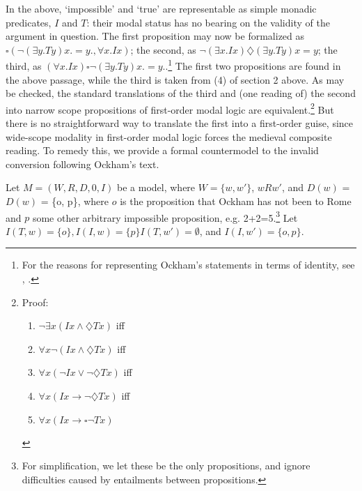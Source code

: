\documentclass[a4paper]{article}
\begin{document}
In the above, `impossible' and `true' are representable as simple monadic predicates, $I$ and $T$: their modal status has no bearing on the validity of the argument in question. The first proposition may now be formalized as $\square(\neg (\exists y.Ty)x. = y., \forall x.Ix)$; the second, as $\neg (\exists x.Ix)\diamondsuit (\exists y.Ty)x=y$; the third, as $(\forall x.Ix)\square \neg (\exists y.Ty)x.=y.$.\footnote{For the reasons for representing Ockham's statements in terms of identity, see \cite{Klima1999}, \cite{Klima2008a}.} The first two propositions are found in the above passage, while the third is taken from (4) of section 2 above. As may be checked, the standard translations of the third and (one reading of) the second into narrow scope propositions of first-order modal logic are equivalent.\footnote{Proof: \begin{enumerate}
		\item $\neg\exists x(Ix \wedge \diamondsuit Tx)$ iff
		\item $\forall x \neg(Ix \wedge \diamondsuit Tx)$ iff
		\item $\forall x (\neg Ix \vee \neg\diamondsuit Tx)$ iff
		\item $\forall x (Ix \rightarrow \neg \diamondsuit Tx)$ iff
		\item $\forall x (Ix \rightarrow \square \neg Tx)$
	\end{enumerate}} 
But there is no straightforward way to translate the first into a first-order guise, since wide-scope modality in first-order modal logic forces the medieval composite reading. To remedy this, we provide a formal countermodel to the invalid conversion following Ockham's text.

Let $M = (W, R, D, 0, I)$ be a model, where $W = \{w, w'\}$, $wRw'$, and $D(w)$ = $D(w)$ = \{o, p\}, where $o$ is the proposition that Ockham has not been to Rome and $p$ some other arbitrary impossible proposition, e.g. 2+2=5.\footnote{For simplification, we let these be the only propositions, and ignore difficulties caused by entailments between propositions.} Let $I(T, w) = \{o\}, I(I, w) = \{p\} I(T, w') = \emptyset$, and $I(I, w') = \{o, p\}$. 
\end{document}
